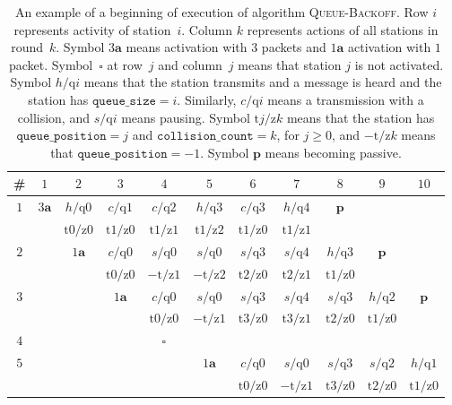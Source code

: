 \documentclass[11pt]{article}
\newlength{\pagewidth}
\newcommand{\RB}{\raisebox{2.5ex}{~}}
\newcommand{\LB}{\raisebox{-1.5ex}{~}}
\begin{document}
\begin{table}[t]
\begin{center}
\begin{tabular}{| c ||c |c |c |c |c | c | c | c | c | c | }
\hline
\RB \LB
\# & $1$ & $2$ & $3$ &$4$&$5$& $6$ & $7$& $8$& $9$ & $10$ \\
\hline\hline
\RB \LB
$1$& $3\boldsymbol{a}$  & $h/\textrm{q} 0 $ & $c/\textrm{q} 1 $ & $c/\textrm{q} 2 $ &$h/\textrm{q} 3 $ & $c/\textrm{q} 3 $ &  $h/\textrm{q} 4 $& $\boldsymbol{p}$& &  \\
&  & $ \textrm{t} 0 / \textrm{z} 0$ & $ \textrm{t} 1 / \textrm{z} 0$ & $ \textrm{t} 1 / \textrm{z} 1$ &$ \textrm{t} 1 / \textrm{z} 2$ & $\textrm{t} 1 / \textrm{z} 0$ & $\textrm{t} 1 / \textrm{z} 1$ & & &  \\
\hline
\RB \LB
$2$ & & $1\boldsymbol{a}$ &  $c/\textrm{q} 0$ & $s/\textrm{q} 0 $ & $s/\textrm{q} 0$ &$s/\textrm{q} 3 $ & $s/\textrm{q} 4$ &$h/\textrm{q} 3$ &$\boldsymbol{p}$&\\
& & &  $ \textrm{t} 0 / \textrm{z} 0$ & $ -\textrm{t} / \textrm{z} 1$ & $ -\textrm{t} / \textrm{z} 2$ &$\textrm{t}2 / \textrm{z} 0$ & $\textrm{t}2 / \textrm{z} 1$ &$\textrm{t}1 / \textrm{z} 0$&&\\
\hline
\RB \LB
$3$ & & & $1\boldsymbol{a}$  & $c/\textrm{q} 0 $ & $s/\textrm{q} 0 $ & $s/\textrm{q} 3$ &$s/\textrm{q} 4$&$s/\textrm{q} 3$&$h/\textrm{q} 2$ &$\boldsymbol{p}$\\
& & & & $ \textrm{t} 0 / \textrm{z} 0$ & $-\textrm{t} / \textrm{z} 1$ & $ \textrm{t}3 / \textrm{z} 0$  &$ \textrm{t}3 / \textrm{z} 1$&$\textrm{t}2 / \textrm{z} 0$&$\textrm{t}1 / \textrm{z} 0$ &\\
\hline\RB \LB
$4$ & & &  & $\boldsymbol{\square}$  & &&&& &\\
\hline
\RB \LB
$5$ & & && & $1\boldsymbol{a}$ &$c/\textrm{q} 0 $ &$s/\textrm{q} 0$ &$s/\textrm{q} 3$& $s/\textrm{q} 2$&$h/\textrm{q} 1$\\
 & & && & &$\textrm{t} 0 / \textrm{z} 0$ &$-\textrm{t}  / \textrm{z}1 $&$\textrm{t} 3  / \textrm{z}0 $& $\textrm{t} 2  / \textrm{z}0 $&$\textrm{t} 1  / \textrm{z}0 $\\
\hline
\end{tabular}
\parbox{\pagewidth}{
~
\caption{\label{tab:example-queue-backoff}
An example of a beginning of execution of algorithm \textsc{Queue-Backoff}.
Row $i$ represents activity of station~$i$.
Column $k$ represents actions of all stations in round~$k$.
Symbol $3\boldsymbol{a}$ means activation with $3$ packets and $1\boldsymbol{a}$ activation with $1$ packet.
Symbol~$\boldsymbol{\square}$ at row~$j$  and column~$j$ means that station $j$ is not activated.
Symbol $h/\textrm{q}i$  means that the station transmits and a message is heard and the station has $\texttt{queue\_size}=i$.
Similarly, $c/\textrm{q} i $ means a transmission with a collision, and $s/\textrm{q} i $ means pausing.
Symbol $ \textrm{t} j / \textrm{z} k$ means that the station has $\texttt{queue\_position} =j$ and $\texttt{collision\_count} = k$, for $j\ge 0$, and $-\textrm{t}/\textrm{z} k$ means that $\texttt{queue\_position} =-1$.
Symbol $\boldsymbol{p}$ means becoming passive.
}}
\end{center}
\end{table}
\end{document}
